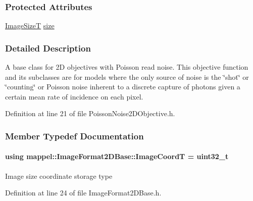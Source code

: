 \subsubsection*{Protected Attributes}
\begin{DoxyCompactItemize}
\item 
\hyperlink{classmappel_1_1ImageFormat2DBase_a49cccf61eb2a768a202634d27fcd81d5}{Image\+SizeT} \hyperlink{classmappel_1_1ImageFormat2DBase_a3be77d2aa6ec9f3815322732950c2a60}{size}
\end{DoxyCompactItemize}


\subsubsection{Detailed Description}
A base class for 2D objectives with Poisson read noise. This objective function and its subclasses are for models where the only source of noise is the \char`\"{}shot\char`\"{} or \char`\"{}counting\char`\"{} or Poisson noise inherent to a discrete capture of photons given a certain mean rate of incidence on each pixel. 



Definition at line 21 of file Poisson\+Noise2\+D\+Objective.\+h.



\subsubsection{Member Typedef Documentation}
\paragraph[{\texorpdfstring{Image\+CoordT}{ImageCoordT}}]{\setlength{\rightskip}{0pt plus 5cm}using {\bf mappel\+::\+Image\+Format2\+D\+Base\+::\+Image\+CoordT} =  uint32\+\_\+t\hspace{0.3cm}{\ttfamily [inherited]}}\hypertarget{classmappel_1_1ImageFormat2DBase_a45e9234d63c357f34ca56c72c12b9e9c}{}\label{classmappel_1_1ImageFormat2DBase_a45e9234d63c357f34ca56c72c12b9e9c}
Image size coordinate storage type 

Definition at line 24 of file Image\+Format2\+D\+Base.\+h.


